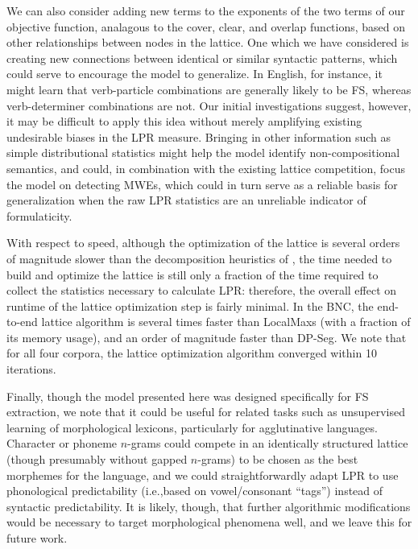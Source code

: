 \documentclass[11pt,letterpaper]{article}
\makeatletter
\def \ie {i.e.,\@ }
\makeatother
\begin{document}
We can also consider adding new terms to the exponents of the two terms of our objective function, analagous to the cover, clear, and overlap functions, based on other relationships between nodes in the lattice. One which we have considered is creating new connections between identical or similar syntactic patterns, which could serve to encourage the model to generalize. In English, for instance, it might learn that verb-particle combinations are generally likely to be FS, whereas verb-determiner combinations are not. Our initial investigations suggest, however, it may be difficult to apply this idea without merely amplifying existing undesirable biases in the LPR measure. Bringing in other information such as simple distributional statistics might help the model identify non-compositional semantics, and could, in combination with the existing lattice competition, focus the model on detecting MWEs, which could in turn serve as a reliable basis for generalization when the raw LPR statistics are an unreliable indicator of formulaticity.

With respect to speed, although the optimization of the lattice is several orders of magnitude slower than the decomposition heuristics of , the time needed to build and optimize the lattice is still only a fraction of the time required to collect the statistics necessary to calculate LPR: therefore, the overall effect on runtime of the lattice optimization step is fairly minimal. In the BNC, the end-to-end lattice algorithm is several times faster than LocalMaxs (with a fraction of its memory usage), and an order of magnitude faster than DP-Seg. We note that for all four corpora, the lattice optimization algorithm converged within 10 iterations.



Finally, though the model presented here was designed specifically for FS extraction, we note that it could be useful for related tasks such as unsupervised learning of morphological lexicons, particularly for agglutinative languages. Character or phoneme $n$-grams could compete in an identically structured lattice (though presumably without gapped $n$-grams) to be chosen as the best morphemes for the language, and we could straightforwardly adapt LPR to use phonological predictability (\ie based on vowel/consonant ``tags'') instead of syntactic predictability. It is likely, though, that further algorithmic modifications would be necessary to target morphological phenomena well, and we leave this for future work.
\end{document}
